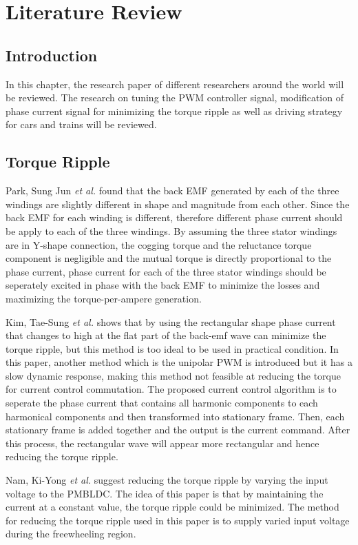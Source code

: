 \chapter{Literature Review}\label{chap:literature}
\section{Introduction}
In this chapter, the research paper of different researchers around the world will be reviewed. The research on tuning the PWM controller signal, modification of phase current signal for minimizing the torque ripple as well as driving strategy for cars and trains will be reviewed.

\section{Torque Ripple}
Park, Sung Jun \textit{et al.} \citep{00824132} found that the back EMF generated by each of the three windings are slightly different in shape and magnitude from each other. Since the back EMF for each winding is different, therefore different phase current should be apply to each of the three windings. By assuming the three stator windings are in Y-shape connection, the cogging torque and the reluctance torque component is negligible and the mutual torque is directly proportional to the phase current, phase current for each of the three stator windings should be seperately excited in phase with the back EMF to minimize the losses and maximizing the torque-per-ampere generation.

Kim, Tae-Sung \textit{et al.} \citep{00976016} shows that by using the rectangular shape phase current that changes to high at the flat part of the back-emf wave can minimize the torque ripple, but this method is too ideal to be used in practical condition. In this paper, another method which is the unipolar PWM is introduced but it has a slow dynamic response, making this method not feasible at reducing the torque for current control commutation. The proposed current control algorithm is to seperate the phase current that contains all harmonic components to each harmonical components and then transformed into stationary frame. Then, each stationary frame is added together and the output is the current command. After this process, the rectangular wave will appear more rectangular and hence reducing the torque ripple.

Nam, Ki-Yong \textit{et al.} \citep{01608454} suggest reducing the torque ripple by varying the input voltage to the PMBLDC. The idea of this paper is that by maintaining the current at a constant value, the torque ripple could be minimized. The method for reducing the torque ripple used in this paper is to supply varied input voltage during the freewheeling region.

